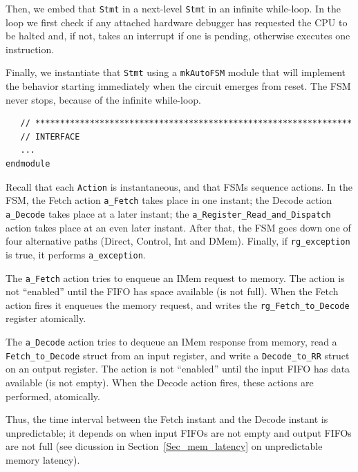 
Then, we embed that \verb|Stmt| in a next-level \verb|Stmt| in an
infinite while-loop.  In the loop we first check if any attached
hardware debugger has requested the CPU to be halted and, if not,
takes an interrupt if one is pending, otherwise executes one
instruction.

Finally, we instantiate that \verb|Stmt| using a \verb|mkAutoFSM|
module that will implement the behavior starting immediately when the
circuit emerges from reset.  The FSM never stops, because of the
infinite while-loop.


{\footnotesize
\begin{Verbatim}
   // ****************************************************************
   // INTERFACE
   ...
endmodule
\end{Verbatim}
}

Recall that each \verb|Action| is instantaneous, and that FSMs
sequence actions.  In the FSM, the Fetch action \verb|a_Fetch| takes
place in one instant; the Decode action \verb|a_Decode| takes place at
a later instant; the \verb|a_Register_Read_and_Dispatch| action takes
place at an even later instant.  After that, the FSM goes down one of
four alternative paths (Direct, Control, Int and DMem).  Finally, if
\verb|rg_exception| is true, it performs \verb|a_exception|.

The \verb|a_Fetch| action tries to enqueue an IMem request to memory.
The action is not ``enabled'' until the FIFO has space available (is
not full).  When the Fetch action fires it enqueues the memory
request, and writes the \verb|rg_Fetch_to_Decode| register atomically.

The \verb|a_Decode| action tries to dequeue an IMem response from
memory, read a \verb|Fetch_to_Decode| struct from an input register,
and write a \verb|Decode_to_RR| struct on an output register.  The
action is not ``enabled'' until the input FIFO has data available (is
not empty).  When the Decode action fires, these actions are
performed, atomically.

Thus, the time interval between the Fetch instant and the Decode
instant is unpredictable; it depends on when input FIFOs are not empty
and output FIFOs are not full (see dicussion in
Section~\ref{Sec_mem_latency} on unpredictable memory latency).

\vspace{2ex}


